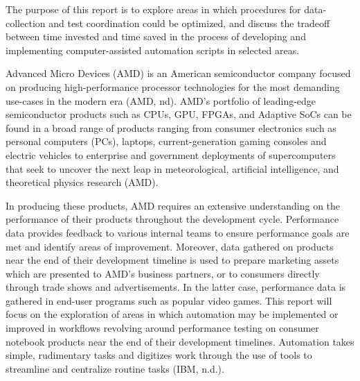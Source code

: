 \documentclass[12pt]{article}
\begin{document}





\indent\hspace{0.5in} The purpose of this report is to explore areas in which procedures for data-collection and test coordination could be optimized, and discuss the tradeoff between time invested and time saved in the process of developing and implementing computer-assisted automation scripts in selected areas.  

\indent\hspace{0.5in} Advanced Micro Devices (AMD) is an American semiconductor company focused on producing high-performance processor technologies for the most demanding use-cases in the modern era (AMD, nd). AMD’s portfolio of leading-edge semiconductor products such as CPUs, GPU, FPGAs, and Adaptive SoCs can be found in a broad range of products ranging from consumer electronics such as personal computers (PCs), laptops, current-generation gaming consoles and electric vehicles to enterprise and government deployments of supercomputers that seek to uncover the next leap in meteorological, artificial intelligence, and theoretical physics research (AMD). 

\indent\hspace{0.5in} In producing these products, AMD requires an extensive understanding on the performance of their products throughout the development cycle. Performance data provides feedback to various internal teams to ensure performance goals are met and identify areas of improvement. Moreover, data gathered on products near the end of their development timeline is used to prepare marketing assets which are presented to AMD’s business partners, or to consumers directly through trade shows and advertisements. In the latter case, performance data is gathered in end-user programs such as popular video games. 
This report will focus on the exploration of areas in which automation may be implemented or improved in workflows revolving around performance testing on consumer notebook products near the end of their development timelines. Automation takes simple, rudimentary tasks and digitizes work through the use of tools to streamline and centralize routine tasks (IBM, n.d.).
\end{document}
